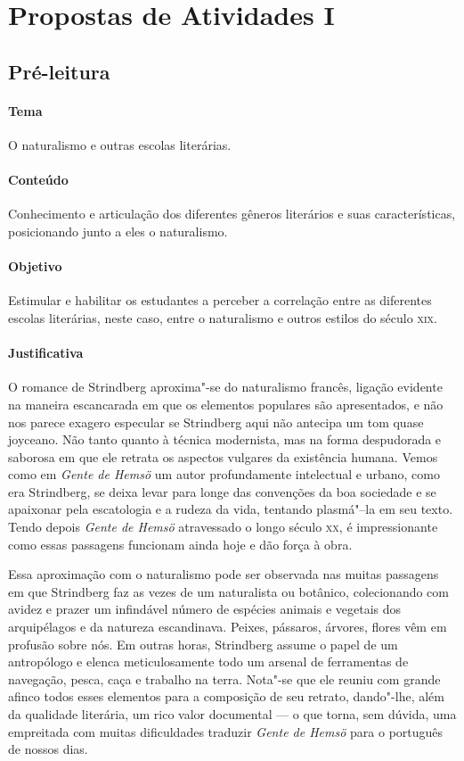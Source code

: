 \documentclass[12pt]{extarticle}
\begin{document}
\tableofcontents

\section{Propostas de Atividades I}

\subsection{Pré-leitura}

\paragraph{Tema} O naturalismo e outras escolas literárias.

\paragraph{Conteúdo} Conhecimento e articulação dos diferentes gêneros 
literários e suas características, posicionando junto a eles o naturalismo. 

\paragraph{Objetivo} Estimular e habilitar os estudantes a perceber a 
correlação entre as diferentes escolas literárias, neste caso, entre o 
naturalismo e outros estilos do século \textsc{xix}.

\paragraph{Justificativa} O romance de Strindberg aproxima"-se do 
naturalismo francês, ligação evidente na maneira escancarada em que os 
elementos populares são apresentados, e não nos parece exagero
especular se Strindberg aqui não antecipa um tom quase joyceano. 
Não tanto quanto à técnica modernista, mas na forma despudorada e saborosa 
em que ele retrata os aspectos vulgares da existência humana.
Vemos como em \textit{Gente de Hemsö} um autor profundamente intelectual 
e urbano, como era Strindberg, se deixa levar para longe das convenções 
da boa sociedade e se apaixonar pela escatologia e a rudeza da vida,
tentando plasmá"--la em seu texto. Tendo depois \textit{Gente de Hemsö} 
atravessado o longo século \textsc{xx}, é impressionante como essas
passagens funcionam ainda hoje e dão força à obra. 

Essa aproximação com o naturalismo pode ser observada nas muitas passagens 
em que Strindberg faz as vezes de um naturalista ou botânico, colecionando 
com avidez e prazer um infindável número de espécies animais e vegetais 
dos arquipélagos e da natureza escandinava. Peixes, pássaros, árvores,
flores vêm em profusão sobre nós. Em outras horas, Strindberg assume o 
papel de um antropólogo e elenca meticulosamente todo um arsenal de
ferramentas de navegação, pesca, caça e trabalho na terra. Nota"-se que
ele reuniu com grande afinco todos esses elementos para a composição de
seu retrato, dando"-lhe, além da qualidade literária, um rico valor 
documental --- o que torna, sem dúvida, uma empreitada com muitas 
dificuldades traduzir \textit{Gente de Hemsö} para o português de nossos dias.
\end{document}
